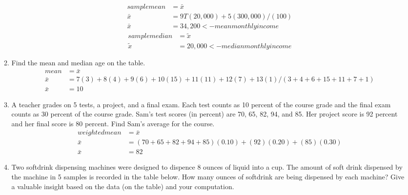 \documentclass{article}
\begin{document}
\begin{enumerate}
\begin{enumerate}
                \begin{equation}
                    \begin{aligned}
                        sample mean&=\bar{x} \\
                        \bar{x}&=9T(20,000)+5(300,000)/(100) \\
                        \bar{x}&=34,200 <- mean monthly income
                    \end{aligned}
                \end{equation}
                \begin{equation}
                    \begin{aligned}
                        sample median&=\tilde{x} \\
                        \tilde{x}&=20,000 <- median monthly income
                    \end{aligned}
                \end{equation}
            \item Find the mean and median age on the table.
                \begin{equation}
                    \begin{aligned}
                        mean&=\bar{x} \\
                        \bar{x}&=7(3)+8(4)+9(6)+10(15)+11(11)+12(7)+13(1)/(3+4+6+15+11+7+1) \\
                        \bar{x}&=10
                    \end{aligned}
                \end{equation}
            \item A teacher grades on 5 tests, a project, and a final exam. Each test counts as 10 percent of the course grade and the final exam counts as 30 percent of the course grade. Sam's test scores (in percent) are 70, 65, 82, 94, and 85. Her project score is 92 percent and her final score is 80 percent. Find Sam's average for the course.
                \begin{equation}
                    \begin{aligned}
                        weighted mean&=\bar{x} \\
                        \bar{x}&=(70+65+82+94+85)(0.10)+(92)(0.20)+(85)(0.30) \\
                        \bar{x}&=82
                    \end{aligned}                  
                \end{equation}
            \item Two softdrink dispensing machines were designed to dispence 8 ounces of liquid into a cup. The amount of soft drink dispensed by the machine in 5 samples is recorded in the table below. How many ounces of softdrink are being dispensed by each machine? Give a valuable insight based on the data (on the table) and your computation.

\end{enumerate}
\end{enumerate}
\end{document}
